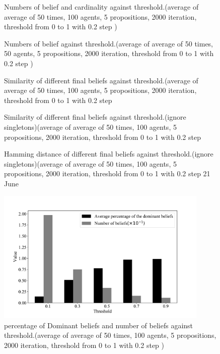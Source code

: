 \documentclass[a4paper,12pt]{article}
\begin{document}
%
\begin{figure}[H]
	\centering
	
	\caption{Numbers of belief and cardinality against threshold.(average of average of 50 times, 100 agents, 5 propositions, 2000 iteration, threshold from 0 to 1 with 0.2 step ) }
\end{figure}
\begin{figure}[H]
	\centering
	
	\caption{Numbers of belief against threshold.(average of average of 50 times, 50 agents, 5 propositions, 2000 iteration, threshold from 0 to 1 with 0.2 step ) }
\end{figure}
\begin{figure}[H]
	\centering
	
	\caption{Similarity of different final beliefs against threshold.(average of average of 50 times, 100 agents, 5 propositions, 2000 iteration, threshold from 0 to 1 with 0.2 step}
\end{figure}
%
\begin{figure}[H]
	\centering
	
	\caption{Similarity of different final beliefs against threshold.(ignore singletons)(average of average of 50 times, 100 agents, 5 propositions, 2000 iteration, threshold from 0 to 1 with 0.2 step}
\end{figure}
\begin{figure}[H]
	\centering
	
	\caption{Hamming distance of different final beliefs against threshold.(ignore singletons)(average of average of 50 times, 100 agents, 5 propositions, 2000 iteration, threshold from 0 to 1 with 0.2 step{\color{red} 21 June}}
\end{figure}
\begin{figure}[H]
	\centering
	\includegraphics[width=0.9\textwidth]{dominant_minham}
	\caption{percentage of Dominant beliefs and number of beliefs against threshold.(average of average of 50 times, 100 agents, 5 propositions, 2000 iteration, threshold from 0 to 1 with 0.2 step ) }
\end{figure}
\end{document}
